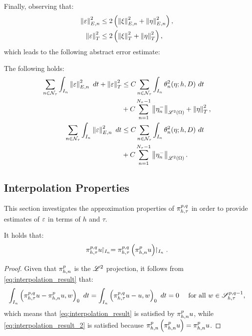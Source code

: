 Finally, observing that:
\begin{align}
    \left\lVert \varepsilon \right\rVert_{E, n}^2 &\leq 2 \left( \left\lVert \xi \right\rVert_{E, n}^2 + \left\lVert \eta \right\rVert_{E, n}^2 \right), \\
    \left\lVert \varepsilon \right\rVert_T^2 &\leq 2 \left( \left\lVert \xi \right\rVert_T^2 + \left\lVert \eta \right\rVert_T^2 \right),
\end{align}
which leads to the following abstract error estimate:
\begin{lemma} \label{lemma:abstract_estimates}
    The following holds:
    \begin{align}
        \sum_{n \in \mathcal{N}_{\tau}} \int_{I_n} \left\lVert \varepsilon \right\rVert_{E, n}^2 ~ dt + \left\lVert \varepsilon \right\rVert_T^2 &\leq C \sum_{n \in \mathcal{N}_{\tau}} \int_{I_n} \theta_n^2(\eta; h, D) ~ dt \\
        &+ C \sum_{n = 1}^{N_{\tau} - 1} \left\lVert \eta_n^- \right\rVert_{\mathscr{L}^{2}(\Omega)} + \left\lVert \eta \right\rVert_T^2, \notag \\ 
        \sum_{n \in \mathcal{N}_{\tau}} \int_{I_n} \left\lVert \varepsilon \right\rVert_{E, n}^2 ~ dt &\leq C \sum_{n \in \mathcal{N}_{\tau}} \int_{I_n} \theta_n^2(\eta; h, D) ~ dt \label{eq:abstract_estimates_2} \\
        &+ C \sum_{n = 1}^{N_{\tau} - 1} \left\lVert \eta_n^- \right\rVert_{\mathscr{L}^{2}(\Omega)}. \notag
    \end{align}
\end{lemma}


\newpage
\subsection{Interpolation Properties}

This section investigates the approximation properties of $\pi_{h, \tau}^{p, q}$ in order to provide estimates of $\varepsilon$ in terms of $h$ and $\tau$.

\begin{lemma}
    It holds that:
    \begin{align}
        \pi_{h, \tau}^{p, q} u \!\!\restriction_{I_n} = \pi_{h, \tau}^{p, q} \left( \pi_{h, n}^p u \right) \!\!\restriction_{I_n}.
    \end{align}
\end{lemma}

\begin{proof}
    Given that $\pi_{h, n}^p$ is the $\mathscr{L}^{2}$ projection, it follows from \cref{eq:interpolation_result} that:
    \begin{align*}
        \int_{I_n} \left( \pi_{h, \tau}^{p, q} u - \pi_{h, n}^p u, w \right)_0 ~ dt &= \int_{I_n} \left( \pi_{h, \tau}^{p, q} u - u, w \right)_0 ~ dt = 0 &\text{ for all } w \in \mathscr{S}^{p, q - 1}_{h, \tau},
    \end{align*}
    which means that \cref{eq:interpolation_result} is satisfied by $\pi_{h, n}^p u$, while \cref{eq:interpolation_result_2} is satisfied because $\pi_{h, n}^p \left( \pi_{h, n}^p u \right) = \pi_{h, n}^p u$.
\end{proof}

